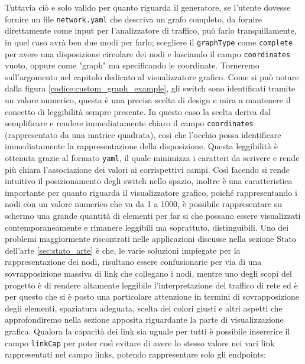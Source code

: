 \documentclass[binding=0.6cm]{sapthesis}
\begin{document}
Tuttavia ciò e solo valido per quanto riguarda il generatore, se l'utente dovesse fornire un file \texttt{network.yaml} che descriva un grafo completo,
da fornire direttamente come input per l'analizzatore di traffico, può farlo tranquillamente, in quel caso avrà ben due modi per farlo;
scegliere il \texttt{graphType} come \texttt{complete} per avere una disposizione circolare dei nodi e lasciando il campo \texttt{coordinates} vuoto, oppure come "graph" ma
specificando le coordinate. Torneremo sull'argomento nel capitolo dedicato al visualizzatore grafico.
Come si può notare dalla figura \ref{codice:custom_graph_example}, gli switch sono identificati tramite un valore numerico, 
questa è una precisa scelta di design e mira a mantenere il concetto di leggibilità sempre
presente. In questo caso la scelta deriva dal semplificare e rendere immediatamente chiaro il campo \texttt{coordinates} 
(rappresentato da una matrice quadrata), così che l'occhio possa identificare immediatamente la rappresentazione della disposizione. Questa leggibilità è ottenuta
grazie al formato \texttt{yaml}, il quale minimizza i caratteri da scrivere e rende più chiara l'associazione dei valori ai corrispettivi campi.
Così facendo si rende intuitivo il posizionamento degli switch nello spazio, inoltre è una caratteristica importante per quanto riguarda il
visualizzatore grafico, poiché rappresentando i nodi con un valore numerico che va da 1 a 1000, è 
possibile rappresentare su schermo una grande quantità di elementi per far si che possano essere visualizzati contemporaneamente e rimanere leggibili ma soprattuto,
 distinguibili. Uno dei problemi maggiormente riscontrati nelle applicazioni discusse nella sezione Stato dell'arte \ref{sec:stato_arte} è che, le varie soluzioni impiegate
 per la rappresentazione dei nodi, risultano essere confusionarie per via di una sovrapposizione massiva di link che collegano i nodi, mentre uno degli scopi del
 progetto è di rendere altamente leggibile l'interpretazione del traffico di rete ed è per questo che si è posto una particolare attenzione in termini di
 sovrapposizione degli elementi, spaziatura adeguata, scelta dei colori giusti e altri aspetti che approfondiremo nella sezione apposita riguardante la parte
 di visualizzazione grafica.
Qualora la capacità dei link sia uguale per tutti è possibile insererire il campo 
\texttt{linkCap} per poter così evitare di avere lo stesso valore nei vari link rappresentati nel campo links, potendo rappresentare solo gli endpoints:
\end{document}
